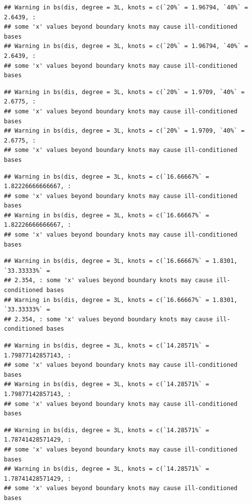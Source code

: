 \documentclass[
]{article}
\begin{document}
\begin{verbatim}
## Warning in bs(dis, degree = 3L, knots = c(`20%` = 1.96794, `40%` = 2.6439, :
## some 'x' values beyond boundary knots may cause ill-conditioned bases
## Warning in bs(dis, degree = 3L, knots = c(`20%` = 1.96794, `40%` = 2.6439, :
## some 'x' values beyond boundary knots may cause ill-conditioned bases
\end{verbatim}

\begin{verbatim}
## Warning in bs(dis, degree = 3L, knots = c(`20%` = 1.9709, `40%` = 2.6775, :
## some 'x' values beyond boundary knots may cause ill-conditioned bases
## Warning in bs(dis, degree = 3L, knots = c(`20%` = 1.9709, `40%` = 2.6775, :
## some 'x' values beyond boundary knots may cause ill-conditioned bases
\end{verbatim}

\begin{verbatim}
## Warning in bs(dis, degree = 3L, knots = c(`16.66667%` = 1.82226666666667, :
## some 'x' values beyond boundary knots may cause ill-conditioned bases
## Warning in bs(dis, degree = 3L, knots = c(`16.66667%` = 1.82226666666667, :
## some 'x' values beyond boundary knots may cause ill-conditioned bases
\end{verbatim}

\begin{verbatim}
## Warning in bs(dis, degree = 3L, knots = c(`16.66667%` = 1.8301, `33.33333%` =
## 2.354, : some 'x' values beyond boundary knots may cause ill-conditioned bases
## Warning in bs(dis, degree = 3L, knots = c(`16.66667%` = 1.8301, `33.33333%` =
## 2.354, : some 'x' values beyond boundary knots may cause ill-conditioned bases
\end{verbatim}

\begin{verbatim}
## Warning in bs(dis, degree = 3L, knots = c(`14.28571%` = 1.79877142857143, :
## some 'x' values beyond boundary knots may cause ill-conditioned bases
## Warning in bs(dis, degree = 3L, knots = c(`14.28571%` = 1.79877142857143, :
## some 'x' values beyond boundary knots may cause ill-conditioned bases
\end{verbatim}

\begin{verbatim}
## Warning in bs(dis, degree = 3L, knots = c(`14.28571%` = 1.78741428571429, :
## some 'x' values beyond boundary knots may cause ill-conditioned bases
## Warning in bs(dis, degree = 3L, knots = c(`14.28571%` = 1.78741428571429, :
## some 'x' values beyond boundary knots may cause ill-conditioned bases
\end{verbatim}
\end{document}
